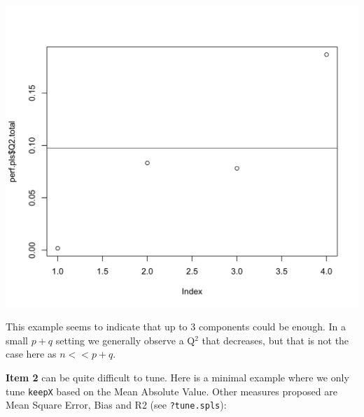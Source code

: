 \documentclass[]{book}
\newenvironment{Shaded}{\begin{snugshade}}{\end{snugshade}}
\newcommand{\KeywordTok}[1]{\textcolor[rgb]{0.13,0.29,0.53}{\textbf{#1}}}
\newcommand{\DataTypeTok}[1]{\textcolor[rgb]{0.13,0.29,0.53}{#1}}
\newcommand{\DecValTok}[1]{\textcolor[rgb]{0.00,0.00,0.81}{#1}}
\newcommand{\FloatTok}[1]{\textcolor[rgb]{0.00,0.00,0.81}{#1}}
\newcommand{\StringTok}[1]{\textcolor[rgb]{0.31,0.60,0.02}{#1}}
\newcommand{\CommentTok}[1]{\textcolor[rgb]{0.56,0.35,0.01}{\textit{#1}}}
\newcommand{\OtherTok}[1]{\textcolor[rgb]{0.56,0.35,0.01}{#1}}
\newcommand{\OperatorTok}[1]{\textcolor[rgb]{0.81,0.36,0.00}{\textbf{#1}}}
\newcommand{\NormalTok}[1]{#1}
\theoremstyle{definition}
\theoremstyle{definition}
\theoremstyle{definition}
\theoremstyle{remark}
\begin{document}
\begin{Shaded}
\end{Shaded}

\begin{center}\includegraphics[width=0.5\linewidth]{Figures/unnamed-chunk-11-1} \end{center}

This example seems to indicate that up to 3 components could be enough.
In a small \(p+q\) setting we generally observe a Q\(^2\) that
decreases, but that is not the case here as \(n << p+q\).

\textbf{Item 2} can be quite difficult to tune. Here is a minimal
example where we only tune \texttt{keepX} based on the Mean Absolute
Value. Other measures proposed are Mean Square Error, Bias and R2 (see
\texttt{?tune.spls}):
\end{document}
